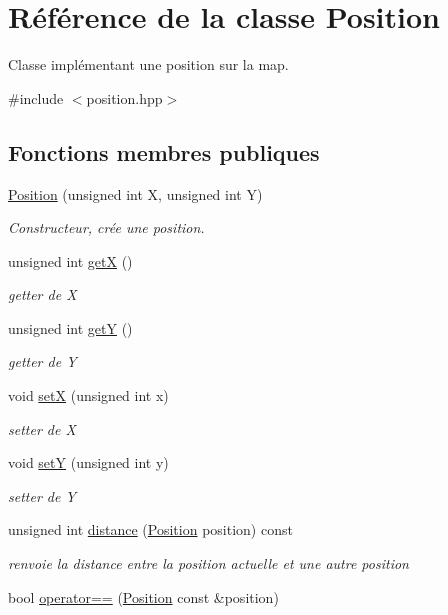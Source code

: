 \hypertarget{classPosition}{\section{Référence de la classe Position}
\label{classPosition}
}


Classe implémentant une position sur la map.  




{\ttfamily \#include $<$position.\+hpp$>$}

\subsection*{Fonctions membres publiques}
\begin{DoxyCompactItemize}
\item 
\hyperlink{classPosition_a3b1b8f105448a2d70dcc622ba475d13f}{Position} (unsigned int X, unsigned int Y)
\begin{DoxyCompactList}\small\item\em Constructeur, crée une position. \end{DoxyCompactList}\item 
unsigned int \hyperlink{classPosition_a175e80a49f22b64fd5adee597d996f12}{get\+X} ()
\begin{DoxyCompactList}\small\item\em getter de X \end{DoxyCompactList}\item 
unsigned int \hyperlink{classPosition_ab4200021493a42e7f6755231ad98bece}{get\+Y} ()
\begin{DoxyCompactList}\small\item\em getter de Y \end{DoxyCompactList}\item 
void \hyperlink{classPosition_aed892c6444ea8f9cf0b03490306d3382}{set\+X} (unsigned int x)
\begin{DoxyCompactList}\small\item\em setter de X \end{DoxyCompactList}\item 
void \hyperlink{classPosition_a557e6df4fac8167f3dd287889d2e1c0a}{set\+Y} (unsigned int y)
\begin{DoxyCompactList}\small\item\em setter de Y \end{DoxyCompactList}\item 
unsigned int \hyperlink{classPosition_a917de1eeb8ba5056636b4274d7444a20}{distance} (\hyperlink{classPosition}{Position} position) const 
\begin{DoxyCompactList}\small\item\em renvoie la distance entre la position actuelle et une autre position \end{DoxyCompactList}\item 
\hypertarget{classPosition_ab3245f578d0c01b1c4a39a8e5df5a82c}{bool \hyperlink{classPosition_ab3245f578d0c01b1c4a39a8e5df5a82c}{operator==} (\hyperlink{classPosition}{Position} const \&position)}\label{classPosition_ab3245f578d0c01b1c4a39a8e5df5a82c}


\end{DoxyCompactItemize}
